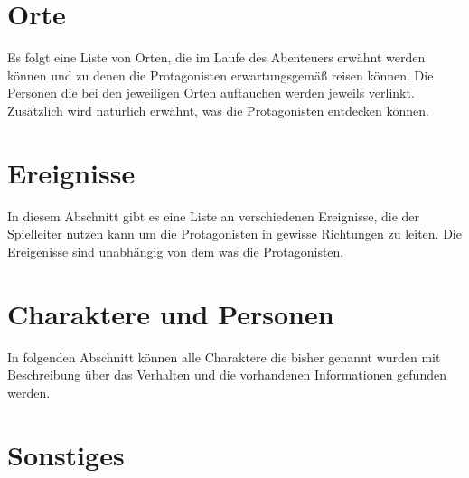 \documentclass[10pt]{article}
\begin{document}
    \tableofcontents

    \newpage
    
    \newpage
    

    \newpage
    

    \newpage
    \section{Orte}
        \label{sec:locs}
        Es folgt eine Liste von Orten, die im Laufe des Abenteuers erwähnt werden können und zu denen die Protagonisten erwartungsgemäß reisen können. Die Personen die bei den jeweiligen Orten auftauchen werden jeweils verlinkt. Zusätzlich wird natürlich erwähnt, was die Protagonisten entdecken können.
        

    \newpage
    \section{Ereignisse}
        \label{sec:events}
        In diesem Abschnitt gibt es eine Liste an verschiedenen Ereignisse, die der Spielleiter nutzen kann um die Protagonisten in gewisse Richtungen zu leiten. Die Ereigenisse sind unabhängig von dem was die Protagonisten.

    \newpage
    \section{Charaktere und Personen}
        In folgenden Abschnitt können alle Charaktere die bisher genannt wurden mit Beschreibung über das Verhalten und die vorhandenen Informationen gefunden werden.
    
    

    \section{Sonstiges}
    
\end{document}
